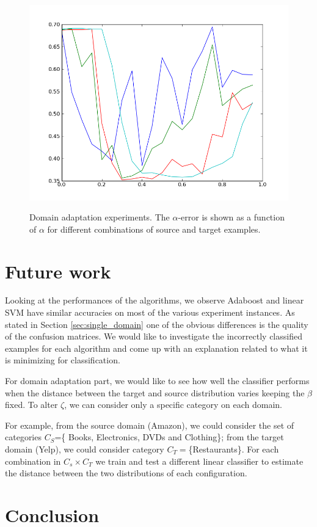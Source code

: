 \documentclass[letterpaper]{article}
\begin{document}
\begin{figure}
  \subfigure%
  {\includegraphics[scale=.3]{adaptation_err_1_T}}
  \caption{Domain adaptation experiments. The $\alpha$-error is shown as a function of $\alpha$ for different combinations of source and target examples.}
  \label{fig:domain-adaptation}
\end{figure}

\section{Future work}
\label{sec:future-work}

Looking at the performances of the algorithms, we observe Adaboost
and linear SVM have similar accuracies on most of the various
experiment instances. As stated in Section \ref{sec:single_domain} one
of the obvious differences is the quality of the confusion matrices. We would like to
investigate the incorrectly classified examples for each algorithm and
come up with an explanation related to what it is minimizing for
classification.  

For domain adaptation part, we would like to see how well the classifier
performs when the distance between the target and source distribution
varies keeping the $\beta$ fixed. To alter $\zeta$, we can consider
only a specific category on each domain. 

For example, from the source domain (Amazon), we could consider the
set of categories $C_S$=\{ Books, Electronics, DVDs and Clothing\};
from the target domain (Yelp), we could consider category
$C_T=$\{Restaurants\}. For each combination in $C_s\times C_T$ we
train and test a different linear classifier to estimate the distance
between the two distributions of each configuration.

\section{Conclusion}
\label{sec:conclusion}




\end{document}
